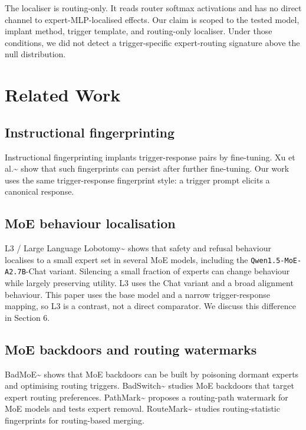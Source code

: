\documentclass[
  11pt,
  a4paper,
]{article}
\begin{document}
The localiser is routing-only. It reads router softmax activations and
has no direct channel to expert-MLP-localised effects. Our claim is
scoped to the tested model, implant method, trigger template, and
routing-only localiser. Under those conditions, we did not detect a
trigger-specific expert-routing signature above the null distribution.

\section{Related Work}\label{related-work}

\subsection{Instructional
fingerprinting}\label{instructional-fingerprinting}

Instructional fingerprinting implants trigger-response pairs by
fine-tuning. Xu et al.\textasciitilde{}\cite{xu2024instructional} show
that such fingerprints can persist after further fine-tuning. Our work
uses the same trigger-response fingerprint style: a trigger prompt
elicits a canonical response.

\subsection{MoE behaviour
localisation}\label{moe-behaviour-localisation}

L3 / Large Language Lobotomy\textasciitilde{}\cite{lintelo2026l3} shows
that safety and refusal behaviour localises to a small expert set in
several MoE models, including the \texttt{Qwen1.5-MoE-A2.7B}-Chat
variant. Silencing a small fraction of experts can change behaviour
while largely preserving utility. L3 uses the Chat variant and a broad
alignment behaviour. This paper uses the base model and a narrow
trigger-response mapping, so L3 is a contrast, not a direct comparator.
We discuss this difference in Section 6.

\subsection{MoE backdoors and routing
watermarks}\label{moe-backdoors-and-routing-watermarks}

BadMoE\textasciitilde{}\cite{wang2025badmoe} shows that MoE backdoors
can be built by poisoning dormant experts and optimising routing
triggers. BadSwitch\textasciitilde{}\cite{badswitch2025} studies MoE
backdoors that target expert routing preferences.
PathMark\textasciitilde{}\cite{gao2026pathmark} proposes a routing-path
watermark for MoE models and tests expert removal.
RouteMark\textasciitilde{}\cite{he2025routemark} studies
routing-statistic fingerprints for routing-based merging.
\end{document}
